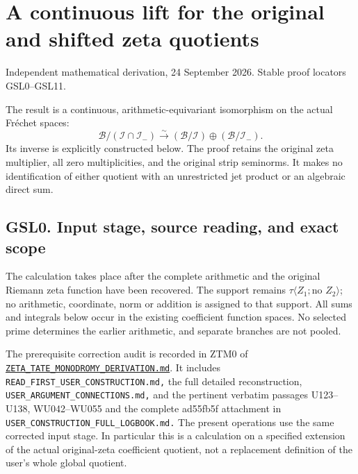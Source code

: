 \section{A continuous lift for the original and shifted zeta
quotients}\label{a-continuous-lift-for-the-original-and-shifted-zeta-quotients}

Independent mathematical derivation, 24 September 2026. Stable proof
locators GSL0--GSL11.

The result is a continuous, arithmetic-equivariant isomorphism on the
actual Fréchet spaces: \[
\mathcal B/(\mathcal I\cap\mathcal I_-)
 \xrightarrow{\sim}
(\mathcal B/\mathcal I)\oplus(\mathcal B/\mathcal I_-).
\tag{GSL0.1}
\] Its inverse is explicitly constructed below. The proof retains the
original zeta multiplier, all zero multiplicities, and the original
strip seminorms. It makes no identification of either quotient with an
unrestricted jet product or an algebraic direct sum.

\subsection{GSL0. Input stage, source reading, and exact
scope}\label{gsl0.-input-stage-source-reading-and-exact-scope}

The calculation takes place after the complete arithmetic and the
original Riemann zeta function have been recovered. The support remains
\(\tau\langle Z_1;\text{no }Z_2\rangle\); no arithmetic, coordinate,
norm or addition is assigned to that support. All sums and integrals
below occur in the existing coefficient function spaces. No selected
prime determines the earlier arithmetic, and separate branches are not
pooled.

The prerequisite correction audit is recorded in ZTM0 of
\href{https://github.com/KokunoYumeto/zeta-function-research-reader/blob/main/workbenches/splitzero-tandem/continuations/20260924-cohomology-weight-and-character-lifts/gct-weight-control/proofs/ZETA_TATE_MONODROMY_DERIVATION.md}{\nolinkurl{ZETA_TATE_MONODROMY_DERIVATION.md}}.
It includes \nolinkurl{READ_FIRST_USER_CONSTRUCTION.md,} the full
detailed reconstruction, \nolinkurl{USER_ARGUMENT_CONNECTIONS.md,} and
the pertinent verbatim passages U123--U138, WU042--WU055 and the
complete ad55fb5f attachment in
\nolinkurl{USER_CONSTRUCTION_FULL_LOGBOOK.md.} The present operations
use the same corrected input stage. In particular this is a calculation
on a specified extension of the actual original-zeta coefficient
quotient, not a replacement definition of the user's whole global
quotient.

